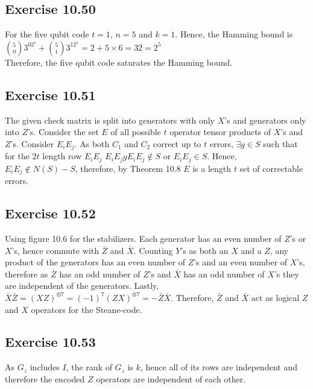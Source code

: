 \documentclass[a4paper,12pt]{article}
\begin{document}
\subsection*{Exercise 10.50}
For the five qubit code $t=1$, $n=5$ and $k=1$. Hence, the Hamming bound is\\
$\displaystyle{5\choose 0}3^02^1+{5\choose 1}3^12^1=2+5\times 6=32=2^5$\\
Therefore, the five qubit code saturates the Hamming bound.
\subsection*{Exercise 10.51}
The given check matrix is split into generators with only $X$'s and generators only into $Z$'s.
Consider the set $E$ of all possible $t$ operator tensor products of $X$'s and $Z$'s. Consider
$E_iE_j$. As both $C_1$ and $C_2$ correct up to $t$ errors, $\exists g\in S$ such that 
for the $2t$ length row $E_iE_j$ $E_iE_jgE_iE_j\notin S$ or $E_iE_j\in S$. Hence,
$E_iE_j\notin N(S)-S$, therefore, by Theorem 10.8 $E$ is a length $t$ set of correctable errors.
\subsection*{Exercise 10.52}
Using figure 10.6 for the stabilizers. Each generator has an even number of $Z$'s or
$X$'s, hence commute with $\bar{Z}$ and $\bar{X}$. 
Counting $Y$'s as both an $X$ and a $Z$, any product of the generators has an even number of $Z$'s
and an even number of $X$'s, therefore as $\bar{Z}$ has an odd number of $Z$'s and
$\bar{X}$ has an odd number of $X$'s they are independent of the generators. Lastly,
$\bar{X}\bar{Z}=(XZ)^{\otimes 7}=(-1)^7(ZX)^{\otimes 7}=-\bar{Z}\bar{X}$. Therefore,
$\bar{Z}$ and $\bar{X}$ act as logical $Z$ and $X$ operators for the Steane-code.
\subsection*{Exercise 10.53}
As $G_z$ includes $I$, the rank of $G_z$ is $k$, hence all of its rows are independent and
therefore the encoded $Z$ operators are independent of each other.
\end{document}
